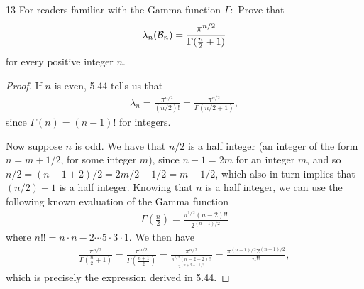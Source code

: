 \begin{exercise}{13}
For readers familiar with the Gamma function $\Gamma:$
Prove that 
\begin{align*}
    \lambda_n(\mathcal{B}_n) = \frac{\pi^{n/2}}{\Gamma(\frac{n}{2} + 1)}
\end{align*}
for every positive integer $n$.
\end{exercise}
\begin{proof}
If $n$ is even, 5.44 tells us that 
\begin{align*}
    \lambda_n = \frac{\pi^{n/2}}{(n/2)!} = \frac{\pi^{n/2}}{\Gamma (n/2 + 1)},
\end{align*}
since $\Gamma(n) = (n-1)!$ for integers.

Now suppose $n$ is odd.
We have that $n/2$ is a half integer (an integer of the form $n = m + 1/2$, for some integer $m$), since $n-1 = 2m$ for an integer $m$, and so $n/2 = (n-1+2)/2 = 2m/2 + 1/2 = m + 1/2$, which also in turn implies that $(n/2) + 1$ is a half integer.
Knowing that $n$ is a half integer, we can use the following known evaluation of the Gamma function 
\begin{align*}
    \Gamma(\frac{n}{2})
    = \frac{\pi^{1/2}(n-2)!!}{2^{(n-1)/2}}
\end{align*}
where $n!! = n \cdot n-2 \cdots 5 \cdot 3 \cdot 1$.
We then have
\begin{align*}
    \frac{\pi^{n/2}}{\Gamma(\frac{n}{2}+1)}
    = \frac{\pi^{n/2}}{\Gamma(\frac{n + 1}{2})}
    = \frac{\pi^{n/2}}{\frac{\pi^{1/2}(n-2+2)!!}{2^{(n+2-1)/2}}}
    = \frac{\pi^{(n-1)/2}2^{(n+1)/2}}{n!!},
\end{align*}
which is precisely the expression derived in 5.44.
\end{proof} 
